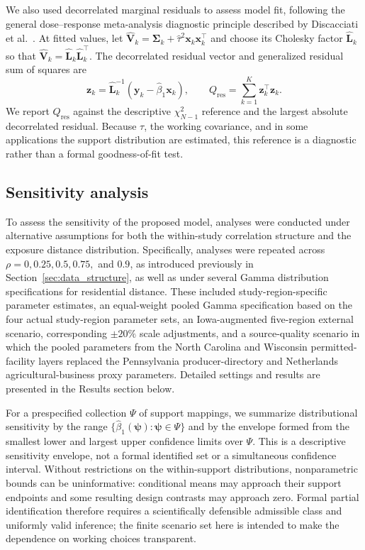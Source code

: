 \documentclass[journal=rsm]{CUP-JNL-DTM}%
\theoremstyle{definition}
\numberwithin{equation}{section}
\begin{document}
We also used decorrelated marginal residuals to assess model fit, following the
general dose--response meta-analysis diagnostic principle described by
Discacciati et al.~\cite{Discacciati2017}. At fitted values, let
$\widehat{\mathbf V}_k=\boldsymbol\Sigma_k+\widehat\tau^2
\mathbf x_k\mathbf x_k^\top$ and choose its Cholesky factor
$\widehat{\mathbf L}_k$ so that
$\widehat{\mathbf V}_k=\widehat{\mathbf L}_k
\widehat{\mathbf L}_k^\top$. The decorrelated residual vector and generalized
residual sum of squares are
\begin{equation}
 \mathbf z_k=\widehat{\mathbf L}_k^{-1}
 (\mathbf y_k-\widehat\beta_1\mathbf x_k),
 \qquad Q_{\mathrm{res}}=\sum_{k=1}^K\mathbf z_k^\top\mathbf z_k.
 \label{eq:residual_check}
\end{equation}
We report $Q_{\mathrm{res}}$ against the descriptive $\chi^2_{N-1}$ reference
and the largest absolute decorrelated residual. Because $\tau$, the working
covariance, and in some applications the support distribution are estimated,
this reference is a diagnostic rather than a formal goodness-of-fit test.

\subsection{Sensitivity analysis}
\label{sec:sensitivity}
To assess the sensitivity of the proposed model, analyses were conducted under alternative assumptions for both the within-study correlation structure and the exposure distance distribution. Specifically, analyses were repeated across $\rho=0,0.25,0.5,0.75,$ and $0.9$, as introduced previously in Section~\ref{sec:data_structure}, as well as under several Gamma distribution specifications for residential distance. These included study-region-specific parameter estimates, an equal-weight pooled Gamma specification based on the four actual study-region parameter sets, an Iowa-augmented five-region external scenario, corresponding $\pm20\%$ scale adjustments, and a source-quality scenario in which the pooled parameters from the North Carolina and Wisconsin permitted-facility layers replaced the Pennsylvania producer-directory and Netherlands agricultural-business proxy parameters. Detailed settings and results are presented in the Results section below.

For a prespecified collection $\Psi$ of support mappings, we summarize
distributional sensitivity by the range
$\{\widehat\beta_1(\boldsymbol\psi):\boldsymbol\psi\in\Psi\}$ and by the
envelope formed from the smallest lower and largest upper confidence limits
over $\Psi$. This is a descriptive sensitivity envelope, not a formal
identified set or a simultaneous confidence interval. Without restrictions on
the within-support distributions, nonparametric bounds can be uninformative:
conditional means may approach their support endpoints and some resulting
design contrasts may approach zero. Formal partial identification therefore
requires a scientifically defensible admissible class and uniformly valid
inference; the finite scenario set here is intended to make the dependence on
working choices transparent.
\end{document}
